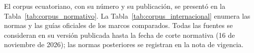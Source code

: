 
\newcommand{\linea}[1]{\rule{#1}{0.4pt}}

\label{anx:corpus}

El corpus ecuatoriano, con su número y su publicación, se presentó en la Tabla~\ref{tab:corpus_normativo}. La Tabla~\ref{tab:corpus_internacional} enumera las normas y las guías oficiales de los marcos comparados. Todas las fuentes se consideran en su versión publicada hasta la fecha de corte normativa (16 de noviembre de 2026); las normas posteriores se registran en la nota de vigencia.

